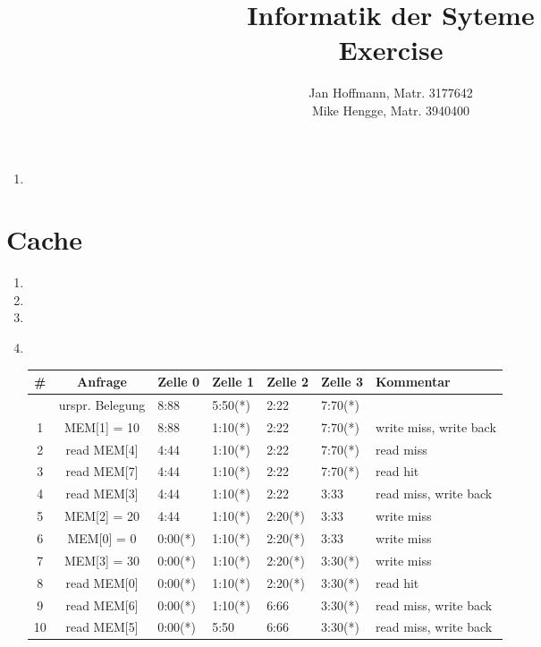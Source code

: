 \documentclass[10pt,a4paper]{article}
\title{Informatik der Syteme \\ Exercise \exnum}
\author{Jan Hoffmann, Matr. 3177642 \\ Mike Hengge,  Matr. 3940400}
\begin{document}
\section{}\label{sec:10.1}
	\begin{enumerate}
		\item
	\end{enumerate}

\section{Cache}\label{sec:10.2}
	\begin{enumerate}
		\item
		\item
		\item
		\item \text{}\\
			\begin{tabular}{cc|lllll}
				\# & Anfrage         & Zelle 0 & Zelle 1 & Zelle 2 & Zelle 3 & Kommentar              \\ \hline
				   & urspr. Belegung & 8:88    & 5:50(*) & 2:22    & 7:70(*) &                        \\
				 1 & MEM[1] = 10     & 8:88    & 1:10(*) & 2:22    & 7:70(*) & write miss, write back \\
				 2 & read MEM[4]     & 4:44    & 1:10(*) & 2:22    & 7:70(*) & read miss              \\
				 3 & read MEM[7]     & 4:44    & 1:10(*) & 2:22    & 7:70(*) & read hit               \\ 
				 4 & read MEM[3]     & 4:44    & 1:10(*) & 2:22    & 3:33    & read miss, write back  \\ 
				 5 & MEM[2] = 20     & 4:44    & 1:10(*) & 2:20(*) & 3:33    & write miss             \\
				 6 & MEM[0] = 0      & 0:00(*) & 1:10(*) & 2:20(*) & 3:33    & write miss             \\ 
				 7 & MEM[3] = 30     & 0:00(*) & 1:10(*) & 2:20(*) & 3:30(*) & write miss             \\ 
				 8 & read MEM[0]     & 0:00(*) & 1:10(*) & 2:20(*) & 3:30(*) & read hit               \\ 
				 9 & read MEM[6]     & 0:00(*) & 1:10(*) & 6:66    & 3:30(*) & read miss, write back  \\ 
				10 & read MEM[5]     & 0:00(*) & 5:50    & 6:66    & 3:30(*) & read miss, write back  \\ 
			\end{tabular}
	\end{enumerate}
			
\end{document}

